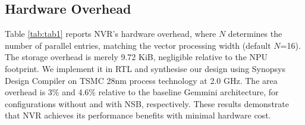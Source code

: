 






\vspace{-5pt}
\subsection{Hardware Overhead}
\vspace{-3pt}
Table \ref{tab:tab1} reports NVR's hardware overhead, where $N$ determines the number of parallel entries, matching the vector processing width (default $N$=16). 
The storage overhead is merely 9.72 KiB, negligible relative to the NPU footprint. 
We implement it in RTL and synthesise our design using Synopsys Design Compiler on TSMC 28nm process technology at 2.0 GHz. 
The area overhead is 3\% and 4.6\% relative to the baseline Gemmini architecture, for configurations without and with NSB, respectively. 
These results demonstrate that NVR achieves its performance benefits with minimal hardware cost.






